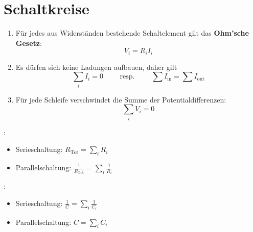 \section{Schaltkreise}

\vspace{1\baselineskip}


\begin{tcolorbox}
    \begin{enumerate}
        \item Für jedes aus Widerständen bestehende Schaltelement gilt das \textbf{Ohm'sche Gesetz}: \begin{equation*}
            V_i = R_i I_i
        \end{equation*}
        
        \item Es dürfen sich keine Ladungen aufbauen, daher gilt \begin{equation*}
            \sum_i I_i = 0
            \quad \quad \text{   resp.  } \quad \quad
            \sum I_{\text{in}} =  \sum I_{\text{out}}
        \end{equation*}
        
        \item Für jede Schleife verschwindet die Summe der Potentialdifferenzen: \begin{equation*}
            \sum_i V_i = 0
        \end{equation*}
    \end{enumerate}
\end{tcolorbox}

\vspace{1\baselineskip}

:
\begin{itemize}
    \item Serieschaltung: $R_{\text{Tot}} = \sum_i R_i$
    \item Parallelschaltung: $\frac{1}{R_{\text{Tot}}} = \sum_i \frac{1}{R_i}$
\end{itemize}

:
\begin{itemize}
    \item Serieschaltung: $\frac{1}{C} = \sum_i \frac{1}{C_i}$
    \item Parallelschaltung: $C = \sum_i C_i$
\end{itemize}

\vspace{1\baselineskip}

